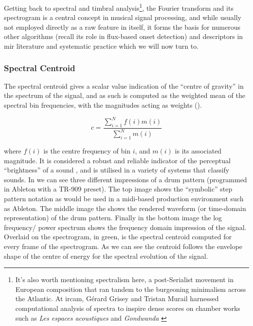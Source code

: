 {{Getting back to spectral and timbral analysis\footnote{It's also worth mentioning spectralism here, a post-Serialist movement in European composition that ran tandem to the burgeoning minimalism across the Atlantic. At \acrshort{ircam}, Gérard Grisey and Tristan Murail harnessed computational analysis of spectra to inspire dense scores on chamber works such as \textit{Les espaces acoustiques} and \textit{Gondwanda} \citep{ross2007rest, Harvey2000}}, the Fourier transform and its spectrogram is a central concept in musical signal processing, and while usually not employed directly as a raw feature in itself, it forms the basis for numerous other algorithms (recall its role in flux-based onset detection) and descriptors in \acrshort{mir} literature and systematic practice which we will now turn to. 

\subsubsection{Spectral Centroid}

The spectral centroid gives a scalar value indication of the ``centre of gravity'' in the spectrum of the signal, and as such is computed as the weighted mean of the spectral bin frequencies, with the magnitudes acting as weights ().

\begin{equation}
\label{eq:centroid}	
c = \frac{\sum_{i=1}^{N}f(i)m(i)}{\sum_{i=1}^{N}m(i)}
\end{equation}

where $f(i)$ is the centre frequency of bin $i$, and $m(i)$ is its associated magnitude. It is considered a robust and reliable indicator of the perceptual ``brightness'' of a sound \citep{Schubert2004}, and is utilised in a variety of systems that classify sounds. In  we can see three different impressions of a drum pattern (programmed in Ableton with a TR-909 preset). The top image shows the ``symbolic'' step pattern notation as would be used in a \acrshort{midi}-based production environment such as Ableton. The middle image the shows the rendered waveform (or time-domain representation) of the drum pattern. Finally in the bottom image the log frequency/ power spectrum shows the frequency domain impression of the signal. Overlaid on the spectrogram, in green, is the spectral centroid computed for every frame of the spectrogram. As we can see the centroid follows the envelope shape of the centre of energy for the spectral evolution of the signal.

}}

